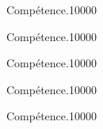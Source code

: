 \begin{pageAuto} %

\begin{ExoAutoN}{Compétence.}{1}{0}{0}{0}{0}

\end{ExoAutoN}

\begin{ExoAutoN}{Compétence.}{1}{0}{0}{0}{0}

\end{ExoAutoN}


\begin{ExoAutoN}{Compétence.}{1}{0}{0}{0}{0}

\end{ExoAutoN}

\end{pageAuto} %


\begin{pageAlgo} %

\begin{ExoAlgoN}{Compétence.}{1}{0}{0}{0}{0}

\end{ExoAlgoN}

\begin{ExoAlgo}{Compétence.}{1}{0}{0}{0}{0}

\end{ExoAlgo}

\end{pageAlgo} %


\begin{pageBrouillon}

\end{pageBrouillon}


